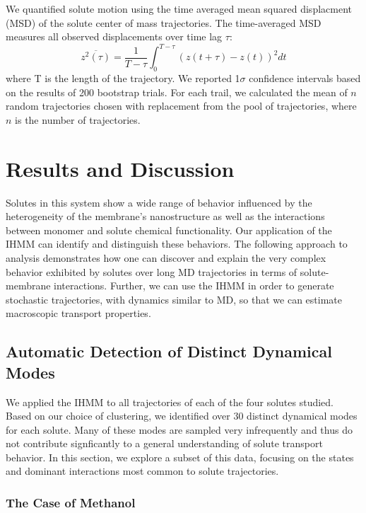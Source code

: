 \documentclass{article}
\begin{document}
  We quantified solute motion using the time averaged mean squared displacment (MSD)
  of the solute center of mass trajectories. The time-averaged MSD measures all observed
  displacements over time lag $\tau$:
  \begin{equation}
  	\overline{z^2(\tau)} = \dfrac{1}{T - \tau}\int_{0}^{T - \tau} (z(t + \tau) - z(t))^2 dt
  \label{eqn:tamsd}
  \end{equation}
  where T is the length of the trajectory. We reported 1$\sigma$ confidence intervals 
  based on the results of 200 bootstrap trials. For each trail, we calculated the mean of 
  $n$ random trajectories chosen with replacement from the pool of trajectories, where 
  $n$ is the number of trajectories.

  \section{Results and Discussion}
  
  Solutes in this system show a wide range of behavior influenced by the 
  heterogeneity of the membrane's nanostructure as well as the interactions 
  between monomer and solute chemical functionality. Our application of the 
  IHMM can identify and distinguish these behaviors. The following approach 
  to analysis demonstrates how one can discover and explain the very complex
  behavior exhibited by solutes over long MD trajectories in terms of 
  solute-membrane interactions. Further, we can use the IHMM in order to generate
  stochastic trajectories, with dynamics similar to MD, so that we can estimate 
  macroscopic transport properties. 	

  \subsection{Automatic Detection of Distinct Dynamical Modes}\label{section:find_modes}
  
  We applied the IHMM to all trajectories of each of the four solutes studied.
  Based on our choice of clustering, we identified over 30 distinct dynamical
  modes for each solute. Many of these modes are sampled very infrequently and thus
  do not contribute signficantly to a general understanding of solute transport behavior.
  In this section, we explore a subset of this data, focusing on the states
  and dominant interactions most common to solute trajectories.

  \subsubsection*{The Case of Methanol}
  
\end{document}
